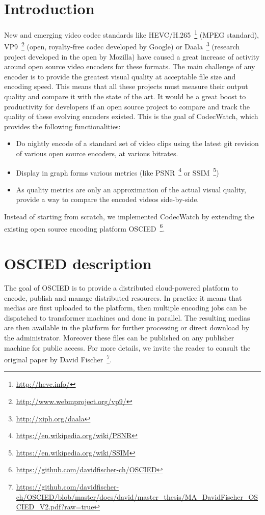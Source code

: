 \documentclass[a4paper,12pt]{article}
\begin{document}
%

\tableofcontents

\newpage

\section{Introduction}
New and emerging video codec standards like
HEVC/H.265~\footnote{\url{http://hevc.info/}} (MPEG standard),
VP9~\footnote{\url{http://www.webmproject.org/vp9/}} (open, royalty-free codec
developed by Google) or Daala~\footnote{\url{http://xiph.org/daala}} (research
project developed in the open by Mozilla) have caused a great increase of
activity around open source video encoders for these formats. The main challenge
of any encoder is to provide the greatest visual quality at acceptable file size
and encoding speed. This means that all these projects must measure their output
quality and compare it with the state of the art. It would be a great boost to
productivity for developers if an open source project to compare and track the
quality of these evolving encoders existed. This is the goal of CodecWatch,
which provides the following functionalities:
\begin{itemize}
\item Do nightly encode of a standard set of video clips using the latest git
revision of various open source encoders, at various bitrates.
\item Display in graph forms various metrics (like
PSNR~\footnote{\url{https://en.wikipedia.org/wiki/PSNR}} or
SSIM~\footnote{\url{https://en.wikipedia.org/wiki/SSIM}})
\item As quality metrics are only an approximation of the actual visual quality,
provide a way to compare the encoded videos side-by-side.
\end{itemize} Instead of starting from scratch, we implemented CodecWatch by
extending the existing open source encoding platform
OSCIED~\footnote{\url{https://github.com/davidfischer-ch/OSCIED}}.

\section{OSCIED description}
The goal of OSCIED is to provide a distributed cloud-powered platform to encode,
publish and manage distributed resources.  In practice it means that medias are
first uploaded to the platform, then multiple encoding jobs can be dispatched to
transformer machines and done in parallel.  The resulting medias are then
available in the platform for further processing or direct download by the
administrator.  Moreover these files can be published on any publisher machine
for public access.
For more details, we invite the reader to consult the original paper by David
Fischer~\footnote{\url{https://github.com/davidfischer-ch/OSCIED/blob/master/docs/david/master_thesis/MA_DavidFischer_OSCIED_V2.pdf?raw=true}}.
\end{document}
